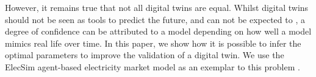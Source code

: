 \documentclass[10pt, conference, compsocconf]{IEEEtran}
\begin{document}
However, it remains true that not all digital twins are equal. Whilst digital twins should not be seen as tools to predict the future, and can not be expected to \cite{Jager2006a}, a degree of confidence can be attributed to a model depending on how well a model mimics real life over time. In this paper, we show how it is possible to infer the optimal parameters to improve the validation of a digital twin. We use the ElecSim agent-based electricity market model as an exemplar to this problem \cite{Kell}.



	
\end{document}
